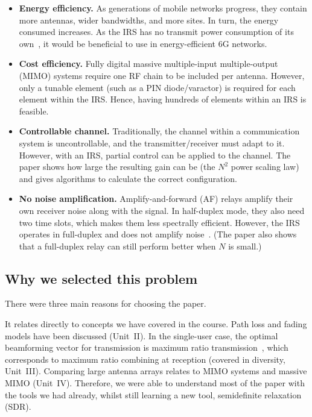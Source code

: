 \documentclass[11pt,a4paper]{article}
\begin{document}
\begin{itemize}[leftmargin=1.4em,itemsep=2pt]
\item \textbf{Energy efficiency.} As generations of mobile networks progress, they contain more
antennas, wider bandwidths, and more sites. In turn, the energy consumed increases. As the IRS has no
transmit power consumption of its own~\cite{wu}, it would be beneficial to use in energy-efficient 6G
networks.
\item \textbf{Cost efficiency.} Fully digital massive multiple-input multiple-output (MIMO) systems require one RF chain to be included
per antenna. However, only a tunable element (such as a PIN diode/varactor) is required for each
element within the IRS. Hence, having hundreds of elements within an IRS is feasible.
\item \textbf{Controllable channel.} Traditionally, the channel within a communication system is
uncontrollable, and the transmitter/receiver must adapt to it. However, with an IRS, partial control
can be applied to the channel. The paper shows how large the resulting gain can be (the $N^2$ power
scaling law) and gives algorithms to calculate the correct configuration.
\item \textbf{No noise amplification.} Amplify-and-forward (AF) relays amplify their own receiver noise
along with the signal. In half-duplex mode, they also need two time slots, which makes them less
spectrally efficient. However, the IRS operates in full-duplex and does not amplify noise~\cite{wu}.
(The paper also shows that a full-duplex relay can still perform better when $N$ is small.)
\end{itemize}

\subsection{Why we selected this problem}

There were three main reasons for choosing the paper.

It relates directly to concepts we have covered in the course. Path loss and fading models have been
discussed (Unit~II). In the single-user case, the optimal beamforming vector for transmission is
maximum ratio transmission~\cite{tse,goldsmith}, which corresponds to maximum ratio combining at
reception (covered in diversity, Unit~III). Comparing large antenna arrays relates to MIMO systems and
massive MIMO (Unit~IV). Therefore, we were able to understand most of the paper with the tools we had
already, whilst still learning a new tool, semidefinite relaxation (SDR).
\end{document}
